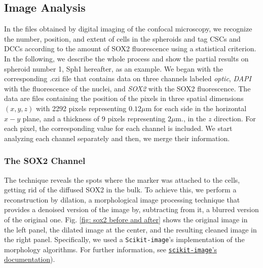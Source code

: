 \documentclass[fleqn,10pt]{wlscirep}
\begin{document}
\subsection*{Image Analysis}
In the files obtained by digital imaging of the confocal microscopy, we recognize the number, position, and extent of cells in the spheroids and tag CSCs and DCCs according to the amount of SOX2 fluorescence using a statistical criterion.  In the following, we describe the whole process and show the partial results on spheroid number 1, \textsf{Sph1} hereafter, as an example. We began with the corresponding \textsf{.czi} file that contains data on three channels labeled \emph{optic}, \emph{DAPI} with the fluorescence of the nuclei, and \emph{SOX2} with the SOX2 fluorescence. The data are files containing the position of the pixels in three spatial dimensions $(x, y, z)$ with 2292 pixels representing $ 0.12 \mu \text{m} $ for each side in the horizontal $x-y$ plane, and a thickness of 9 pixels representing  $2 \mu \text{m.}$, in the $z$ direction. For each pixel, the corresponding value for each channel is included. We start analyzing each channel separately and then, we merge their information. 

\subsubsection*{The SOX2 Channel}
The technique reveals the spots where the marker was attached to the cells, getting rid of the diffused SOX2 in the bulk. To achieve this, we perform a reconstruction by dilation, a morphological image processing technique that provides a denoised version of the image by, subtracting from it, a blurred version of the original one. Fig. \ref{fig: sox2 before and after} shows the original image in the left panel, the dilated image at the center, and the resulting cleaned image in the right panel.
Specifically, we used a \lstinline{Scikit-image}'s implementation of the morphology algorithms. For further information, see \href{https://scikit-image.org/docs/stable/auto_examples/color_exposure/plot_regional_maxima.html#sphx-glr-auto-examples-color-exposure-plot-regional-maxima-py}{\lstinline{scikit-image}'s documentation}). 
\end{document}
